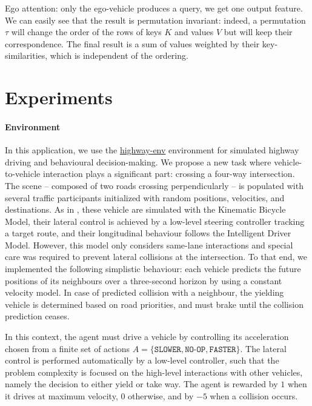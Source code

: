 \documentclass{article}
\begin{document}
Ego attention: only the ego-vehicle produces a query, we get one output feature. We can easily see that the result is permutation invariant: indeed, a permutation $\tau$ will change the order of the rows of keys $K$ and values $V$ but will keep their correspondence. The final result is a sum of values weighted by their key-similarities, which is independent of the ordering. %

\section{Experiments}
\paragraph{Environment}

In this application, we use the \href{https://github.com/eleurent/highway-env}{highway-env} environment \citep{highway-env} for simulated highway driving and behavioural decision-making. We propose a new task where vehicle-to-vehicle interaction plays a significant part: crossing a four-way intersection.
The scene -- composed of two roads crossing perpendicularly -- is populated with several traffic participants initialized with random positions, velocities, and destinations. As in \citep{highway-env}, these vehicle are simulated with the Kinematic Bicycle Model, their lateral control is achieved by a low-level steering controller tracking a target route, and their longitudinal behaviour follows the Intelligent Driver Model. However, this model only considers same-lane interactions and special care was required to prevent lateral collisions at the intersection. To that end, we implemented the following simplistic behaviour: each vehicle predicts the future positions of its neighbours over a three-second horizon by using a constant velocity model. In case of predicted collision with a neighbour, the yielding vehicle is determined based on road priorities, and must brake until the collision prediction ceases. 

In this context, the agent must drive a vehicle by controlling its acceleration chosen from a finite set of actions $A = \{\texttt{SLOWER}, \texttt{NO-OP}, \texttt{FASTER}\}$. The lateral control is performed automatically by a low-level controller, such that the problem complexity is focused on the high-level interactions with other vehicles, namely the decision to either yield or take way. The agent is rewarded by $1$ when it drives at maximum velocity, $0$ otherwise, and by $-5$ when a collision occurs.
\end{document}
